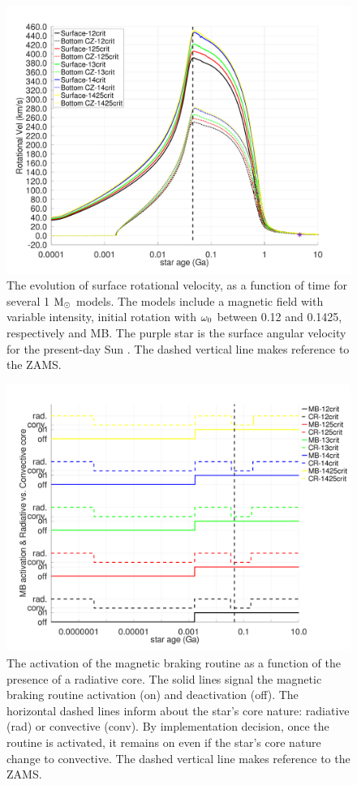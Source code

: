 \documentclass[fleqn,usenatbib]{mnras}
\begin{document}
\begin{figure}
	\includegraphics[clip,width=\columnwidth]{figures/paper2/rot_vel_var_vel_var_g3.pdf}
    \caption{The evolution of surface rotational velocity, as a function of time for several 1 $\mathrm{M}_\odot$ models. The models include a magnetic field with variable intensity, initial rotation with $\omega_{\mathrm{0}}$ between 0.12 and 0.1425, respectively and MB. The purple star is the surface angular velocity for the present-day Sun \citep{Gill2012}. The dashed vertical line makes reference to the ZAMS.}
    \label{fig:rot_vel_var_vel_var_g3}
\end{figure}

\begin{figure}
	\includegraphics[clip,width=\columnwidth]{figures/paper2/mb_act_var_vel_g3.pdf}
    \caption{The activation of the magnetic braking routine as a function of the presence of a radiative core. The solid lines signal the magnetic braking routine activation (on) and deactivation (off). The horizontal dashed lines inform about the star's core nature: radiative (rad) or convective (conv). By implementation decision, once the routine is activated, it remains on even if the star's core nature change to convective. The dashed vertical line makes reference to the ZAMS.}
    \label{fig:mb_act_var_vel_g3}
\end{figure}
\end{document}
